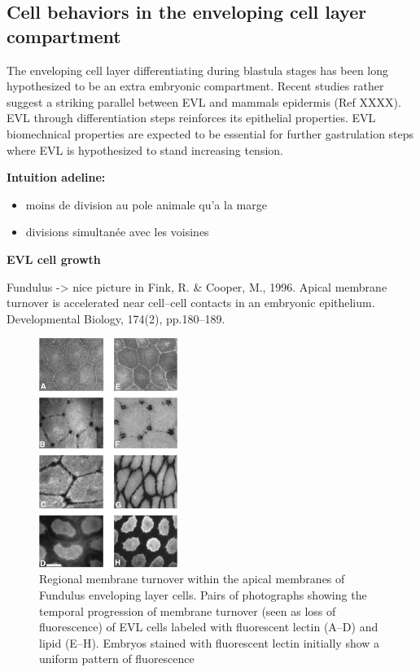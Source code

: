 \subsection{Cell behaviors in the enveloping cell layer compartment  }

  The enveloping cell layer differentiating during blastula stages has been long hypothesized to be an extra embryonic compartment. Recent studies rather suggest a striking parallel between EVL and mammals epidermis (Ref XXXX). EVL through differentiation steps reinforces its epithelial properties. EVL biomechnical properties are expected to be essential for further gastrulation steps where EVL is hypothesized to stand increasing tension.  

\textbf{Intuition adeline:}
\begin{itemize}
	\item moins de division au pole animale qu'a la marge
	\item divisions simultanée avec les voisines
\end{itemize}

\textbf{EVL cell growth}

  Fundulus -> nice picture in Fink, R. & Cooper, M., 1996. Apical membrane turnover is accelerated near cell–cell contacts in an embryonic epithelium. Developmental Biology, 174(2), pp.180–189. \cite{Fink:1996un}
\begin{figure}
\begin{center}
\includegraphics[width=0.4\textwidth]{../../images/Cases_Studies/Case_3_EVL/growth/fink_1996.png}
\end{center}
\caption{Regional membrane turnover within the apical membranes of Fundulus enveloping layer cells. Pairs of photographs showing the temporal progression of membrane turnover (seen as loss of fluorescence) of EVL cells labeled with fluorescent lectin (A–D) and lipid (E–H). Embryos stained with fluorescent lectin initially show a uniform pattern of fluorescence \cite{Fink:1996un}}
\label{growth_fink_1996.png}
\end{figure}

